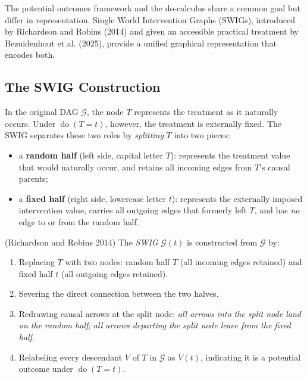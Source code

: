 \documentclass[
  a4paper,
]{book}
\providecommand{\tightlist}{%
  \setlength{\itemsep}{0pt}\setlength{\parskip}{0pt}}
\newcommand{\doop}{\operatorname{do}}
\newcommand{\Gcal}{\mathcal{G}}
\begin{document}
The potential outcomes framework and the do-calculus share a common goal
but differ in representation. Single World Intervention Graphs (SWIGs),
introduced by Richardson and Robins (2014) and given an accessible
practical treatment by Bezuidenhout et al. (2025), provide a unified
graphical representation that encodes both.

\subsection{The SWIG Construction}\label{sec-swig-def}

In the original DAG \(\Gcal\), the node \(T\) represents the treatment
as it naturally occurs. Under \(\doop(T{=}t)\), however, the treatment
is externally fixed. The SWIG separates these two roles by
\emph{splitting} \(T\) into two pieces:

\begin{itemize}
\tightlist
\item
  a \textbf{random half} (left side, capital letter \(T\)): represents
  the treatment value that would naturally occur, and retains all
  incoming edges from \(T\)'s causal parents;
\item
  a \textbf{fixed half} (right side, lowercase letter \(t\)): represents
  the externally imposed intervention value, carries all outgoing edges
  that formerly left \(T\), and has \emph{no} edge to or from the random
  half.
\end{itemize}

\begin{tcolorbox}[enhanced jigsaw, arc=.35mm, bottomrule=.15mm, bottomtitle=1mm, breakable, colback=white, colbacktitle=quarto-callout-note-color!10!white, colframe=quarto-callout-note-color-frame, coltitle=black, left=2mm, leftrule=.75mm, opacityback=0, opacitybacktitle=0.6, rightrule=.15mm, title={Definition: Single World Intervention Graph}, titlerule=0mm, toprule=.15mm, toptitle=1mm]

(Richardson and Robins 2014) The \emph{SWIG} \(\Gcal(t)\) is constructed
from \(\Gcal\) by:

\begin{enumerate}
\def\labelenumi{\arabic{enumi}.}
\tightlist
\item
  Replacing \(T\) with two nodes: random half \(T\) (all incoming edges
  retained) and fixed half \(t\) (all outgoing edges retained).
\item
  Severing the direct connection between the two halves.
\item
  Redrawing causal arrows at the split node: \emph{all arrows into the
  split node land on the random half}; \emph{all arrows departing the
  split node leave from the fixed half}.
\item
  Relabeling every descendant \(V\) of \(T\) in \(\Gcal\) as \(V(t)\),
  indicating it is a potential outcome under \(\doop(T{=}t)\).
\end{enumerate}

\end{tcolorbox}
\end{document}
